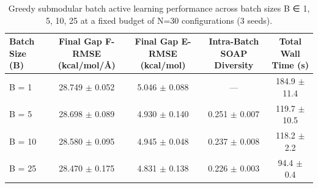 \begin{table}[htbp]
\centering
\caption{Greedy submodular batch active learning performance across batch sizes B ∈ {1, 5, 10, 25} at a fixed budget of N=30 configurations (3 seeds).}
\label{tab:batch_analysis}
\begin{tabular}{lcccc}
\toprule
Batch Size (B) & Final Gap F-RMSE (kcal/mol/Å) & Final Gap E-RMSE (kcal/mol) & Intra-Batch SOAP Diversity & Total Wall Time (s) \\
\midrule
B = 1 & 28.749 $\pm$ 0.052 & 5.046 $\pm$ 0.088 & — & 184.9 $\pm$ 11.4 \\
B = 5 & 28.698 $\pm$ 0.089 & 4.930 $\pm$ 0.140 & 0.251 $\pm$ 0.007 & 119.7 $\pm$ 10.5 \\
B = 10 & 28.580 $\pm$ 0.095 & 4.945 $\pm$ 0.048 & 0.237 $\pm$ 0.008 & 118.2 $\pm$ 2.2 \\
B = 25 & 28.470 $\pm$ 0.175 & 4.831 $\pm$ 0.138 & 0.226 $\pm$ 0.003 & 94.4 $\pm$ 0.4 \\
\bottomrule
\end{tabular}
\end{table}
